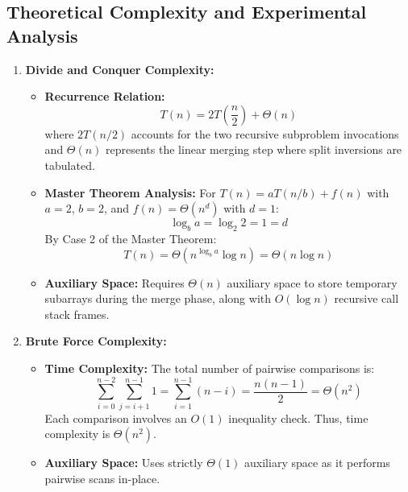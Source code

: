 \documentclass[12pt]{article}
\begin{document}
\subsection{Theoretical Complexity and Experimental Analysis}
\begin{enumerate}
    \item \textbf{Divide and Conquer Complexity:}
    \begin{itemize}
        \item \textbf{Recurrence Relation:}
        \begin{equation}
            T(n) = 2T\left(\frac{n}{2}\right) + \Theta(n)
        \end{equation}
        where $2T(n/2)$ accounts for the two recursive subproblem invocations and $\Theta(n)$ represents the linear merging step where split inversions are tabulated.
        \item \textbf{Master Theorem Analysis:}
        For $T(n) = aT(n/b) + f(n)$ with $a = 2$, $b = 2$, and $f(n) = \Theta(n^d)$ with $d = 1$:
        \begin{equation}
            \log_b a = \log_2 2 = 1 = d
        \end{equation}
        By Case 2 of the Master Theorem:
        \begin{equation}
            T(n) = \Theta(n^{\log_b a} \log n) = \Theta(n \log n)
        \end{equation}
        \item \textbf{Auxiliary Space:}
        Requires $\Theta(n)$ auxiliary space to store temporary subarrays during the merge phase, along with $O(\log n)$ recursive call stack frames.
    \end{itemize}

    \item \textbf{Brute Force Complexity:}
    \begin{itemize}
        \item \textbf{Time Complexity:} The total number of pairwise comparisons is:
        \begin{equation}
            \sum_{i=0}^{n-2} \sum_{j=i+1}^{n-1} 1 = \sum_{i=1}^{n-1} (n - i) = \frac{n(n-1)}{2} = \Theta(n^2)
        \end{equation}
        Each comparison involves an $O(1)$ inequality check. Thus, time complexity is $\Theta(n^2)$.
        \item \textbf{Auxiliary Space:} Uses strictly $\Theta(1)$ auxiliary space as it performs pairwise scans in-place.
    \end{itemize}


\end{enumerate}
\end{document}
